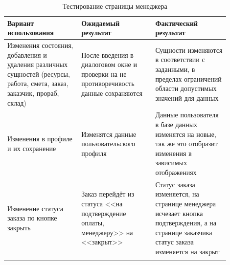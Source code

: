 \begin{center}
	\begin{longtable}{|p{0.3\linewidth}|p{0.3\linewidth}|p{0.3\linewidth}|}
		\hline
		\textbf{Вариант использования} & \textbf{Ожидаемый результат}&
		\textbf{Фактический результат}\\
		\hline
		Изменения состояния, добавления и удаления различных сущностей (ресурсы, работа, смета, заказ, заказчик, прораб, склад)  & После введения в диалоговом окне и проверки на не противоречивость данные сохраняются & Сущности изменяются в соответствии с заданными, в пределах ограничений области допустимых значений для данных\\
		\hline
		Изменения в профиле и их сохранение  & Изменятся данные пользовательского профиля & Данные пользователя в базе данных изменятся на новые, так же это отобразит изменения в зависимых отображениях \\
		\hline
		Изменение статуса заказа по кнопке закрыть & Заказ перейдёт из статуса <<на подтверждение оплаты, менеджеру>> на <<закрыт>> & Статус заказа изменяется, на странице менеджера исчезает кнопка подтверждения, а на странице заказчика статус заказа изменяется на закрыт \\
		\hline
		\caption{Тестирование страницы менеджера}\\
	\end{longtable}
\end{center}
\newpage

